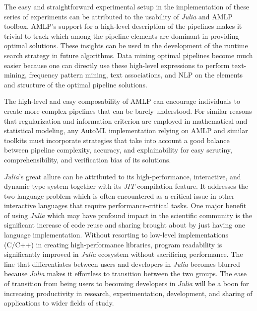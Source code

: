 \documentclass{juliacon}
\begin{document}
\vskip 6pt

The easy and straightforward experimental setup in the implementation of these
series of experiments can be attributed to the 
usability of \emph{Julia} and AMLP toolbox.
AMLP's support for a high-level description of the pipelines
makes it trivial to track which among the
pipeline elements are dominant in providing optimal solutions. These insights can
be used in the development of the runtime search strategy in future algorithms.
Data mining optimal pipelines become much easier because one can
directly use these high-level expressions to perform text-mining,
frequency pattern mining, text associations,
and NLP on the elements and structure of the optimal pipeline solutions.

\vskip 6pt

The high-level and easy composability of AMLP can encourage individuals
to create more complex pipelines that can be barely understood. 
For similar reasons that regularization and information 
criterion are employed in mathematical and
statistical modeling, any AutoML implementation relying on AMLP and similar
toolkits must incorporate strategies that take into account a good balance
between pipeline complexity, accuracy, and explainability for easy scrutiny,
comprehensibility, and verification bias of its solutions.

\vskip 6pt

\emph{Julia}'s great allure can be attributed to
its high-performance, interactive, and dynamic type system
together with its \emph{JIT} compilation feature. It addresses the
two-language problem which is often encountered as a critical issue
in other interactive languages that require performance-critical tasks.
One major benefit of using \emph{Julia} which
may have profound impact in the scientific community is the significant
increase of code reuse and sharing brought about by just having one language
implementation.  Without resorting to low-level implementations (C/C++) in
creating high-performance libraries, program readability is significantly
improved in \emph{Julia} ecosystem without sacrificing performance. The line
that differentiates between users and developers in \emph{Julia} becomes blurred
because \emph{Julia} makes it effortless to
transition between the two groups. The ease of
transition from being users to becoming developers in \emph{Julia} will be a boon for
increasing productivity in research, experimentation, development, and
sharing of applications to wider fields of study.
\end{document}
